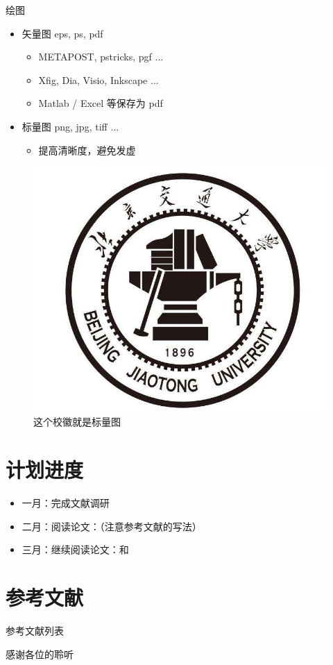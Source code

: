 \documentclass{beamer}
\begin{document}
\begin{frame}{绘图}
    \begin{itemize}
        \item 矢量图 eps, ps, pdf
        \begin{itemize}
            \item METAPOST, pstricks, pgf $\ldots$
            \item Xfig, Dia, Visio, Inkscape $\ldots$
            \item Matlab / Excel 等保存为 pdf
        \end{itemize}
        \item 标量图 png, jpg, tiff $\ldots$
        \begin{itemize}
            \item 提高清晰度，避免发虚
        \end{itemize}
    \end{itemize}
    \begin{figure}[htpb]
        \centering
        \includegraphics[width=0.2\linewidth]{pic/bjtu_logo.jpeg}
        \caption{这个校徽就是标量图}
    \end{figure}
\end{frame}


\section{计划进度}
\begin{frame}
    \begin{itemize}
        \item 一月：完成文献调研
        \item 二月：阅读论文：\cite{cao2019adversarial}（注意参考文献的写法）
        \item 三月：继续阅读论文：\cite{brunke2022safe}和\cite{pei2017deepxplore}
    \end{itemize}
\end{frame}



\section{参考文献}
\begin{frame}[allowframebreaks]{参考文献列表}
    
    
\end{frame}



\begin{frame}
    \begin{center}
        {\Huge\calligra 感谢各位的聆听}
    \end{center}
\end{frame}
\end{document}
